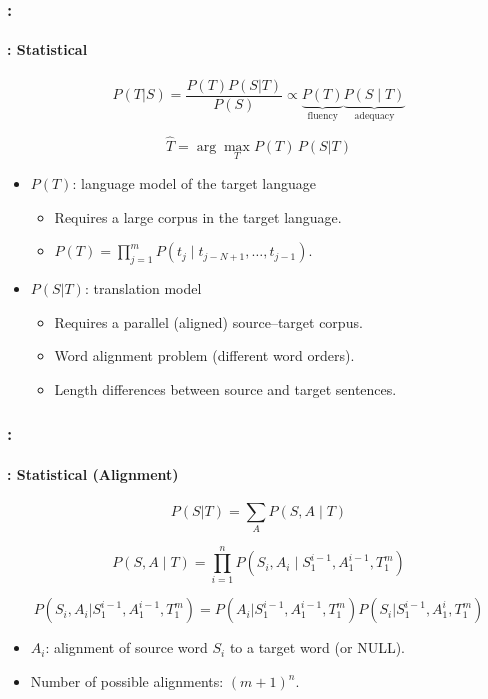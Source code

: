 \documentclass[xcolor=table]{beamer}
\begin{document}
\begin{frame}
	\frametitle{\insertshortsubtitle: \insertsection}
	\framesubtitle{\insertsubsection: Statistical}
	
	\[
	P(T|S) = \frac{P(T) P(S|T)}{P(S)} \propto \underbrace{P(T)}_{\text{fluency}} \underbrace{P(S \mid T)}_{\text{adequacy}}
	\]
	
	\[
	\hat{T} = \arg\max_{T} P(T)\, P(S|T)
	\]
	
	\begin{itemize}
		\item $P(T)$: language model of the target language
		\begin{itemize}
			\item Requires a large corpus in the target language.
			\item $P(T) = \prod_{j=1}^{m} P(t_j \mid t_{j-N+1}, \ldots, t_{j-1})$.
		\end{itemize}
		
		\item $P(S|T)$: translation model
		\begin{itemize}
			\item Requires a parallel (aligned) source--target corpus.
			\item Word alignment problem (different word orders).
			\item Length differences between source and target sentences.
		\end{itemize}
	\end{itemize}
	
\end{frame}

\begin{frame}
	\frametitle{\insertshortsubtitle: \insertsection}
	\framesubtitle{\insertsubsection: Statistical (Alignment)}
	
	\[
	P(S|T) = \sum_{A} P(S, A \mid T)
	\]
	
	\[
	P(S, A \mid T) = \prod_{i=1}^{n} P(S_i, A_i \mid S_1^{i-1}, A_1^{i-1}, T_1^{m})
	\]
	
	\[
	P(S_i, A_i | S_1^{i-1}, A_1^{i-1}, T_1^{m}) = P(A_i | S_1^{i-1}, A_1^{i-1}, T_1^{m}) P(S_i | S_1^{i-1}, A_1^{i}, T_1^{m})
	\]
	
	\begin{itemize}
		\item $A_i$: alignment of source word $S_i$ to a target word (or NULL).
		\item Number of possible alignments: $(m + 1)^n$.
	\end{itemize}
	
\end{frame}
\end{document}
